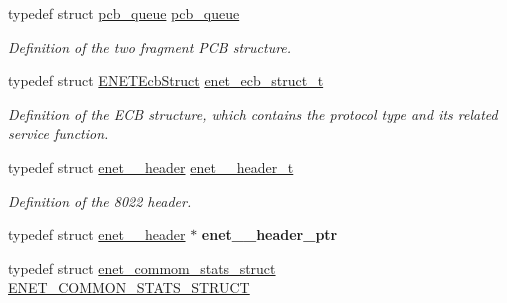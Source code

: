 \begin{DoxyCompactItemize}
\item 
typedef struct \hyperlink{structpcb__queue}{pcb\+\_\+queue} \hyperlink{group__enet__rtcs__adaptor_ga9fe7e7a8671c415c956d343371a91725}{pcb\+\_\+queue}\hypertarget{group__enet__rtcs__adaptor_ga9fe7e7a8671c415c956d343371a91725}{}\label{group__enet__rtcs__adaptor_ga9fe7e7a8671c415c956d343371a91725}

\begin{DoxyCompactList}\small\item\em Definition of the two fragment P\+CB structure. \end{DoxyCompactList}\item 
typedef struct \hyperlink{structENETEcbStruct}{E\+N\+E\+T\+Ecb\+Struct} \hyperlink{group__enet__rtcs__adaptor_ga427cbeb7134423f7e4deee640dc0fe62}{enet\+\_\+ecb\+\_\+struct\+\_\+t}\hypertarget{group__enet__rtcs__adaptor_ga427cbeb7134423f7e4deee640dc0fe62}{}\label{group__enet__rtcs__adaptor_ga427cbeb7134423f7e4deee640dc0fe62}

\begin{DoxyCompactList}\small\item\em Definition of the E\+CB structure, which contains the protocol type and it\textquotesingle{}s related service function. \end{DoxyCompactList}\item 
typedef struct \hyperlink{structenet__8022__header}{enet\+\_\+\_\+header} \hyperlink{group__enet__rtcs__adaptor_ga9efecbf54cdcdbe0f25585a82a9a59f0}{enet\+\_\+\_\+header\+\_\+t}\hypertarget{group__enet__rtcs__adaptor_ga9efecbf54cdcdbe0f25585a82a9a59f0}{}\label{group__enet__rtcs__adaptor_ga9efecbf54cdcdbe0f25585a82a9a59f0}

\begin{DoxyCompactList}\small\item\em Definition of the 8022 header. \end{DoxyCompactList}\item 
typedef struct \hyperlink{structenet__8022__header}{enet\+\_\+\_\+header} $\ast$ {\bfseries enet\+\_\+\_\+header\+\_\+ptr}\hypertarget{group__enet__rtcs__adaptor_gaaf86e1a33cc7b64166ac644e487ffcd9}{}\label{group__enet__rtcs__adaptor_gaaf86e1a33cc7b64166ac644e487ffcd9}

\item 
typedef struct \hyperlink{structenet__commom__stats__struct}{enet\+\_\+commom\+\_\+stats\+\_\+struct} \hyperlink{group__enet__rtcs__adaptor_ga14e03c6c977d2cd6771f2852d1b2db19}{E\+N\+E\+T\+\_\+\+C\+O\+M\+M\+O\+N\+\_\+\+S\+T\+A\+T\+S\+\_\+\+S\+T\+R\+U\+CT}\hypertarget{group__enet__rtcs__adaptor_ga14e03c6c977d2cd6771f2852d1b2db19}{}\label{group__enet__rtcs__adaptor_ga14e03c6c977d2cd6771f2852d1b2db19}


\end{DoxyCompactItemize}
